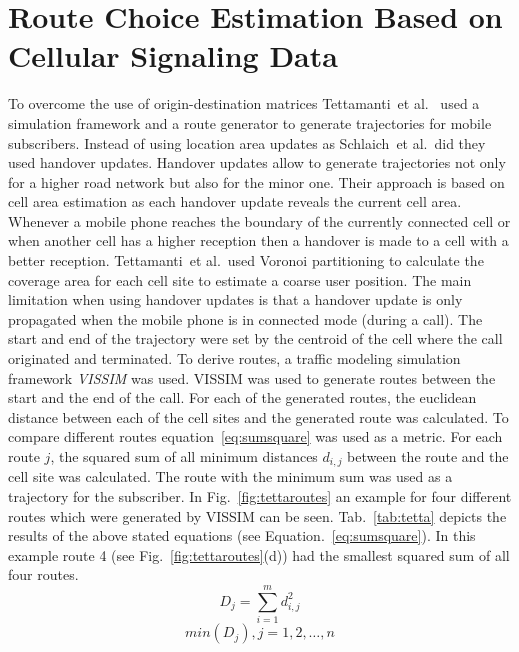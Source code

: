 \documentclass[master,english]{hgbthesis}
\begin{document}
\section{Route Choice Estimation Based on Cellular Signaling Data}
To overcome the use of origin-destination matrices Tettamanti~et al.\ \cite{Tettamanti2012} used a simulation framework and a route generator to generate trajectories for mobile subscribers. Instead of using location area updates as Schlaich~et al.\ did they used handover updates. Handover updates allow to generate trajectories not only for a higher road network but also for the minor one. Their approach is based on cell area estimation as each handover update reveals the current cell area. Whenever a mobile phone reaches the boundary of the currently connected cell or when another cell has a higher reception then a handover is made to a cell with a better reception. Tettamanti~et al.\ used Voronoi partitioning to calculate the coverage area for each cell site to estimate a coarse user position.
The main limitation when using handover updates is that a handover update is only propagated when the mobile phone is in connected mode (during a call).
The start and end of the trajectory were set by the centroid of the cell where the call originated and terminated. To derive routes, a traffic modeling simulation framework \emph{VISSIM} was used. VISSIM was used to generate routes between the start and the end of the call. For each of the generated routes, the euclidean distance between each of the cell sites and the generated route was calculated. To compare different routes equation~\ref{eq:sumsquare} was used  as a metric. For each route $j$, the squared sum of all minimum distances $d_{i,j}$ between the route and the cell site was calculated. The route with the minimum sum was used as a trajectory for the subscriber.
In Fig.~\ref{fig:tettaroutes} an example for four different routes which were generated by VISSIM can be seen. Tab.~\ref{tab:tetta} depicts the results of the above stated equations (see Equation.\ \ref{eq:sumsquare}). In this example route 4 (see Fig.~\ref{fig:tettaroutes}(d)) had the smallest squared sum of all four routes. 
\begin{equation}
\label{eq:sumsquare}
D_j=\sum_{i=1}^{m} d_{i,j}^{2}
\end{equation}
\begin{equation}
\label{eq:minsum}
min(D_j), j = 1,2,\ldots,n
\end{equation}
\end{document}
